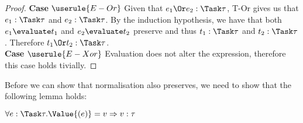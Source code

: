 \begin{proof}
  \noindent\textbf{Case} $\userule{E-Or}$
      Given that $e_1\Or e_2:\Task\tau$, T-Or gives us that $e_1:\Task\tau$ and
      $e_2:\Task\tau$. By the induction hypothesis, we have that both
      $e_1\evaluate t_1$ and $e_2\evaluate t_2$ preserve and thus $t_1:\Task\tau$
      and $t_2:\Task\tau$. Therefore $t_1\Or t_2:\Task\tau$.\\

  \noindent\textbf{Case} $\userule{E-Xor}$
      Evaluation does not alter the expression, therefore this case holds tivially.
\end{proof}

Before we can show that normalisation also preserves, we need to show that the following lemma holds:\\

\begin{lemma}
  $\forall e:\Task\tau . \Value{(e)}=v \implies v:\tau$
\end{lemma}
